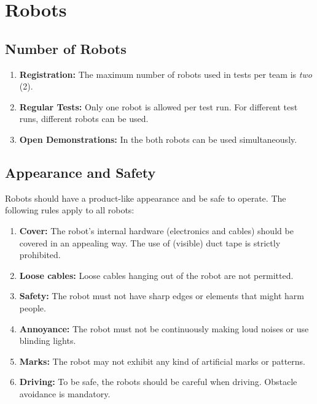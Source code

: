 \section{Robots}
\label{sec:rules:robots}

\subsection{Number of Robots}
\label{sec:rules:robotsnumber}

\begin{enumerate}
	\item \textbf{Registration:} The maximum number of robots used in tests per team is \emph{two} (2).
	\item \textbf{Regular Tests:} Only one robot is allowed per test run. For different test runs, different robots can be used.
	\item \textbf{Open Demonstrations:} In the  both robots can be used simultaneously.
\end{enumerate}

\subsection{Appearance and Safety}
\label{sec:rules:robotappearance}

Robots should have a product-like appearance and be safe to operate. The following rules apply to all robots:
\begin{enumerate}
	\item \textbf{Cover:} The robot's internal hardware (electronics and cables) should be covered in an appealing way. The use of (visible) duct tape is strictly prohibited.
	\item \textbf{Loose cables:} Loose cables hanging out of the robot are not permitted.
	\item \textbf{Safety:} The robot must not have sharp edges or elements that might harm people.
	\item \textbf{Annoyance:} The robot must not be continuously making loud noises or use blinding lights.
	\item \textbf{Marks:} The robot may not exhibit any kind of artificial marks or patterns.
	\item \textbf{Driving:} To be safe, the robots should be careful when driving. Obstacle avoidance is mandatory.
\end{enumerate}







